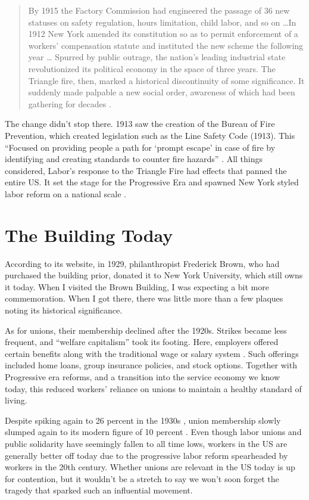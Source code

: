 \documentclass[12pt]{article}
\begin{document}
\begin{quote}
By 1915 the Factory Commission had engineered the passage of 36 new statuses on
safety regulation, hours limitation, child labor, and so on \dots In 1912 New
York amended its constitution so as to permit enforcement of a workers'
compensation statute and instituted the new scheme the following year \dots
Spurred by public outrage, the nation's leading industrial state revolutionized
its political economy in the space of three years. The Triangle fire, then,
marked a historical discontinuity of some significance. It suddenly made
palpable a new social order, awareness of which had been gathering for decades
\parencite[646]{Ev1995}.
\end{quote}

The change didn't stop there. 1913 saw the creation of the Bureau of Fire
Prevention, which created legislation such as the Line Safety Code (1913). This
``Focused on providing people a path for `prompt escape' in case of fire by
identifying and creating standards to counter fire hazards''
\parencite[7]{martineztriangle}. All things considered, Labor's response to the
Triangle Fire had effects that panned the entire US. It set the stage for
the Progressive Era and spawned New York styled labor reform on a national
scale \parencite{Ev1995}. 

\section{The Building Today}

According to its website, in 1929, philanthropist Frederick Brown, who had
purchased the building prior, donated it to New York University, which still
owns it today. When I visited the Brown Building, I was expecting a bit more
commemoration. When I got there, there was little more than a few plaques noting
its historical significance.

As for unions, their membership declined after the 1920s. Strikes became less
frequent, and ``welfare capitalism'' took its footing. Here, employers
offered certain benefits along with the traditional wage or salary system
\parencite{WorkingClass}. Such offerings included home loans, group
insurance policies, and stock options. Together with Progressive era reforms,
and a transition into the service economy we know today,
this reduced workers' reliance on unions to maintain a healthy standard of
living.

Despite spiking again to 26 percent in the 1930s \parencite{WorkingClass}, union
membership slowly slumped again to its modern figure of 10 percent
\parencite{indexes2018bureau}. Even though labor unions and public solidarity have
seemingly fallen to all time lows, workers in the US are generally better off
today due to the progressive labor reform spearheaded by workers in the 20th
century. Whether unions are relevant in the US today is up for contention, but
it wouldn't be a stretch to say we won't soon forget the tragedy that sparked such an influential
movement.
\end{document}
